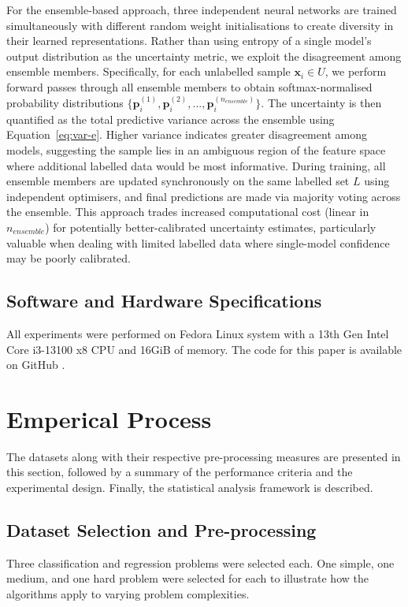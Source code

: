 \documentclass[10pt, conference]{IEEEtran}
\begin{document}
For the ensemble-based approach, three independent neural networks are trained simultaneously with different random weight initialisations to create diversity in their learned representations. Rather than using entropy of a single model's output distribution as the uncertainty metric, we exploit the disagreement among ensemble members. Specifically, for each unlabelled sample $\mathbf{x}_i \in U$, we perform forward passes through all ensemble members to obtain softmax-normalised probability distributions $\{\mathbf{p}^{(1)}_i, \mathbf{p}^{(2)}_i, ..., \mathbf{p}^{(n_{ensemble})}_i\}$. The uncertainty is then quantified as the total predictive variance across the ensemble using Equation~\ref{eq:var-e}. Higher variance indicates greater disagreement among models, suggesting the sample lies in an ambiguous region of the feature space where additional labelled data would be most informative. During training, all ensemble members are updated synchronously on the same labelled set $L$ using independent optimisers, and final predictions are made via majority voting across the ensemble. This approach trades increased computational cost (linear in $n_{ensemble}$) for potentially better-calibrated uncertainty estimates, particularly valuable when dealing with limited labelled data where single-model confidence may be poorly calibrated.

\subsection{Software and Hardware Specifications}
All experiments were performed on Fedora Linux system with a 13th Gen Intel Core i3-13100 x8 CPU and 16GiB of memory. The code for this paper is available on GitHub \cite{github}.



\section{Emperical Process}
The datasets along with their respective pre-processing measures are presented in this section, followed by a summary of the performance criteria and the experimental design. Finally, the statistical analysis framework is described.
\subsection{Dataset Selection and Pre-processing}
Three classification and regression problems were selected each. One simple, one medium, and one hard problem were selected for each to illustrate how the algorithms apply to varying problem complexities. 
\end{document}
